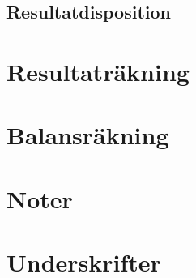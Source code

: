 \documentclass{article}
\begin{document}
\subsection*{Resultatdisposition}

\pagebreak
\section*{Resultaträkning}

\pagebreak
\section*{Balansräkning}

\pagebreak
\section*{Noter}

\pagebreak
\section*{Underskrifter}
\end{document}
